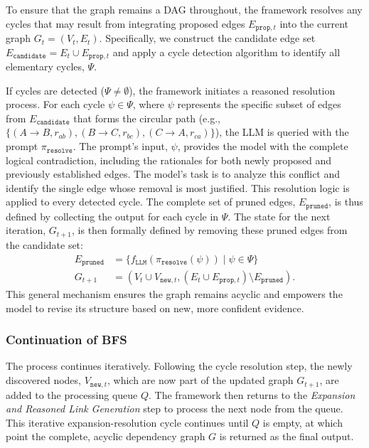 To ensure that the graph remains a DAG throughout, the framework resolves any cycles that may result from integrating proposed edges $E_{\mathtt{prop}, t}$ into the current graph $G_t = (V_t, E_t)$. Specifically, we construct the candidate edge set $E_{\mathtt{candidate}} = E_t \cup E_{\mathtt{prop}, t}$ and apply a cycle detection algorithm to identify all elementary cycles, $\Psi$. 

If cycles are detected ($\Psi \neq \emptyset$), the framework initiates a reasoned resolution process. For each cycle $\psi \in \Psi$, where $\psi$ represents the specific subset of edges from $E_{\mathtt{candidate}}$ that forms the circular path (e.g., $\{ (A \to B, r_{ab}), (B \to C, r_{bc}), (C \to A, r_{ca}) \}$), the LLM is queried with the prompt $\pi_{\mathtt{resolve}}$. The prompt's input, $\psi$, provides the model with the complete logical contradiction, including the rationales for both newly proposed and previously established edges. The model's task is to analyze this conflict and identify the single edge whose removal is most justified. This resolution logic is applied to every detected cycle. The complete set of pruned edges, $E_{\mathtt{pruned}}$, is thus defined by collecting the output for each cycle in $\Psi$. The state for the next iteration, $G_{t+1}$, is then formally defined by removing these pruned edges from the candidate set:
\begin{equation}
    \begin{aligned}
        E_{\mathtt{pruned}} &= \{ f_{\mathtt{LLM}}(\pi_{\mathtt{resolve}}(\psi)) \mid \psi \in \Psi \} \\
        G_{t+1} &= (V_t \cup V_{\mathtt{new}, t}, (E_t \cup E_{\mathtt{prop}, t}) \setminus E_{\mathtt{pruned}}).
    \end{aligned}
\end{equation}
This general mechanism ensures the graph remains acyclic and empowers the model to revise its structure based on new, more confident evidence.


\subsubsection{Continuation of BFS}

The process continues iteratively. Following the cycle resolution step, the newly discovered nodes, $V_{\mathtt{new}, t}$, which are now part of the updated graph $G_{t+1}$, are added to the processing queue $Q$. The framework then returns to the \textit{Expansion and Reasoned Link Generation} step to process the next node from the queue. This iterative expansion-resolution cycle continues until $Q$ is empty, at which point the complete, acyclic dependency graph $G$ is returned as the final output.

